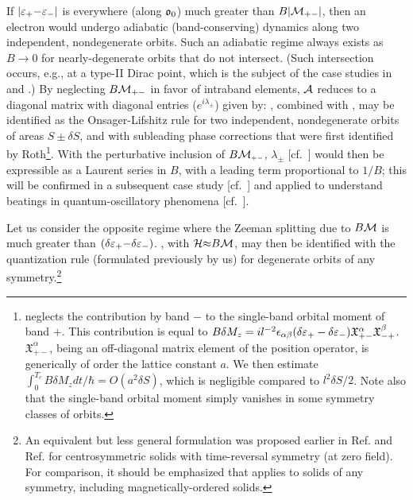 \documentclass[aps, showpacs, twocolumn, notitlepage, superscriptaddress]{revtex4-1}
\begin{document}
 If $|\varepsilon_+{-}\varepsilon_-|$ is everywhere (along $\mathfrak{o}_0$) much greater than $B|{\cal M}_{+-}|$, then an electron would undergo adiabatic (band-conserving) dynamics\cite{nenciu_review} along two independent, nondegenerate orbits. Such an adiabatic regime always exists as $B{\rightarrow} 0$ for nearly-degenerate orbits that do not intersect. (Such intersection occurs, e.g., at a type-II Dirac point, which is the subject of the case studies in  and .)
By  neglecting  $B{\cal M}_{+-}$ in favor of intraband elements,  ${\cal A}$ reduces to a diagonal matrix with  diagonal entries ($e^{i\lambda_{\pm}}$) given by:
, combined with , may be identified as the Onsager-Lifshitz rule\cite{Onsager,lifshitz_kosevich,lifshitz_kosevich_jetp} for two independent, nondegenerate orbits of areas $S{\pm}\delta S$, and with subleading phase corrections that were first identified by Roth\cite{rothmag}\footnote{ neglects the contribution by band $-$ to the single-band orbital moment\cite{chang_berry_1996} of band $+$. This contribution is equal to $B\delta M_z=il^{-2}\epsilon_{\alpha\beta}(\delta \varepsilon_+-\delta \varepsilon_-)\mathfrak{X}^{\alpha}_{+-}\mathfrak{X}^{\beta}_{-+}$. $\mathfrak{X}^{\alpha}_{+-}$, being an off-diagonal matrix element of the position operator, is generically of order the lattice constant $a$. We then estimate $\int_0^{T_c} B\delta M_z dt/\hbar=O(a^2 \delta S)$, which is negligible compared to $l^2\delta S/2$. Note also that the single-band orbital moment simply vanishes in some symmetry classes of orbits\cite{100p}.}. With the perturbative inclusion of $B{\cal M}_{\scriptscriptstyle{+-}}$, $\lambda_{\pm}$ [cf.\ ] would then be expressible as a Laurent series in $B$, with a leading term proportional to $1/B$; this will be confirmed in a subsequent case study [cf.\ ] and applied to understand beatings in quantum-oscillatory phenomena [cf.\ ].

 Let us consider the opposite regime where the Zeeman splitting due to $B{\cal M}$ is much greater than $(\delta \varepsilon_+{-}\delta\varepsilon_-)$. , with ${\cal H}{\approx}B{\cal M}$, may then be identified with the quantization rule (formulated previously by us\cite{topoferm,100p}) for degenerate orbits of any symmetry.\footnote{An equivalent but less general formulation was proposed earlier in Ref.  and Ref.  for centrosymmetric solids with time-reversal symmetry (at zero field). For comparison, it should be emphasized that  applies to solids of any symmetry, including magnetically-ordered solids.}
\end{document}
